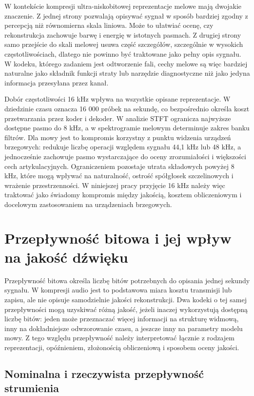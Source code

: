 W kontekście kompresji ultra-niskobitowej reprezentacje melowe mają dwojakie znaczenie. Z jednej strony pozwalają opisywać sygnał w sposób bardziej zgodny z percepcją niż równomierna skala liniowa. Może to ułatwiać ocenę, czy rekonstrukcja zachowuje barwę i energię w istotnych pasmach. Z drugiej strony samo przejście do skali melowej usuwa część szczegółów, szczególnie w wysokich częstotliwościach, dlatego nie powinno być traktowane jako pełny opis sygnału. W kodeku, którego zadaniem jest odtworzenie fali, cechy melowe są więc bardziej naturalne jako składnik funkcji straty lub narzędzie diagnostyczne niż jako jedyna informacja przesyłana przez kanał.

Dobór częstotliwości 16 kHz wpływa na wszystkie opisane reprezentacje. W dziedzinie czasu oznacza 16 000 próbek na sekundę, co bezpośrednio określa koszt przetwarzania przez koder i dekoder. W analizie STFT ogranicza najwyższe dostępne pasmo do 8 kHz, a w spektrogramie melowym determinuje zakres banku filtrów. Dla mowy jest to kompromis korzystny z punktu widzenia urządzeń brzegowych: redukuje liczbę operacji względem sygnału 44{,}1 kHz lub 48 kHz, a jednocześnie zachowuje pasmo wystarczające do oceny zrozumiałości i większości cech artykulacyjnych. Ograniczeniem pozostaje utrata składowych powyżej 8 kHz, które mogą wpływać na naturalność, ostrość spółgłosek szczelinowych i wrażenie przestrzenności. W niniejszej pracy przyjęcie 16 kHz należy więc traktować jako świadomy kompromis między jakością, kosztem obliczeniowym i docelowym zastosowaniem na urządzeniach brzegowych.

\section{Przepływność bitowa i jej wpływ na jakość dźwięku}
\label{sec:przeplywnosc-jakosc}

Przepływność bitowa określa liczbę bitów potrzebnych do opisania jednej sekundy sygnału. W kompresji audio jest to podstawowa miara kosztu transmisji lub zapisu, ale nie opisuje samodzielnie jakości rekonstrukcji. Dwa kodeki o tej samej przepływności mogą uzyskiwać różną jakość, jeżeli inaczej wykorzystują dostępną liczbę bitów: jeden może przeznaczać więcej informacji na strukturę widmową, inny na dokładniejsze odwzorowanie czasu, a jeszcze inny na parametry modelu mowy. Z tego względu przepływność należy interpretować łącznie z rodzajem reprezentacji, opóźnieniem, złożonością obliczeniową i sposobem oceny jakości.

\subsection{Nominalna i rzeczywista przepływność strumienia}
\label{subsec:nominalna-rzeczywista-przeplywnosc}

